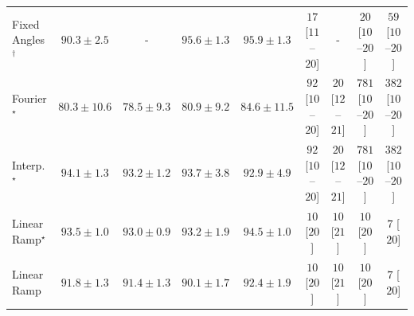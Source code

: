 \begin{tabular}{l|cccc|cccc|}
Fixed Angles$^\dagger$ & {\cellcolor[HTML]{045B8F}} \color[HTML]{F1F1F1} $90.3\pm 2.5$ & {\cellcolor[HTML]{000000}} \color[HTML]{F1F1F1} {\cellcolor{white}} \color{black} - & {\cellcolor[HTML]{023D60}} \color[HTML]{F1F1F1} $95.6\pm 1.3$ & {\cellcolor[HTML]{023B5D}} \color[HTML]{F1F1F1} $95.9\pm 1.3$ & {\cellcolor[HTML]{FFF5F1}} \color[HTML]{000000} $17$ [$11$--$20$] & {\cellcolor[HTML]{000000}} \color[HTML]{F1F1F1} {\cellcolor{white}} \color{black} - & {\cellcolor[HTML]{FFF4F0}} \color[HTML]{000000} $20$ [$10$--$20$] & {\cellcolor[HTML]{FEEBE7}} \color[HTML]{000000} $59$ [$10$--$20$] \\
Fourier$^\star$ & {\cellcolor[HTML]{2D8ABD}} \color[HTML]{F1F1F1} $80.3\pm 10.6$ & {\cellcolor[HTML]{4094C3}} \color[HTML]{F1F1F1} $78.5\pm 9.3$ & {\cellcolor[HTML]{2987BC}} \color[HTML]{F1F1F1} $80.9\pm 9.2$ & {\cellcolor[HTML]{0872B1}} \color[HTML]{F1F1F1} $84.6\pm 11.5$ & {\cellcolor[HTML]{FDE3E0}} \color[HTML]{000000} $92$ [$10$--$20$] & {\cellcolor[HTML]{FFF4F0}} \color[HTML]{000000} $20$ [$12$--$21$] & {\cellcolor[HTML]{49006A}} \color[HTML]{F1F1F1} $781$ [$10$--$20$] & {\cellcolor[HTML]{F76EA3}} \color[HTML]{F1F1F1} $382$ [$10$--$20$] \\
Interp.$^\star$ & {\cellcolor[HTML]{03466E}} \color[HTML]{F1F1F1} $94.1\pm 1.3$ & {\cellcolor[HTML]{034B76}} \color[HTML]{F1F1F1} $93.2\pm 1.2$ & {\cellcolor[HTML]{034871}} \color[HTML]{F1F1F1} $93.7\pm 3.8$ & {\cellcolor[HTML]{034D79}} \color[HTML]{F1F1F1} $92.9\pm 4.9$ & {\cellcolor[HTML]{FDE3E0}} \color[HTML]{000000} $92$ [$10$--$20$] & {\cellcolor[HTML]{FFF4F0}} \color[HTML]{000000} $20$ [$12$--$21$] & {\cellcolor[HTML]{49006A}} \color[HTML]{F1F1F1} $781$ [$10$--$20$] & {\cellcolor[HTML]{F76EA3}} \color[HTML]{F1F1F1} $382$ [$10$--$20$] \\
Linear Ramp$^\star$ & {\cellcolor[HTML]{034973}} \color[HTML]{F1F1F1} $93.5\pm 1.0$ & {\cellcolor[HTML]{034C78}} \color[HTML]{F1F1F1} $93.0\pm 0.9$ & {\cellcolor[HTML]{034B76}} \color[HTML]{F1F1F1} $93.2\pm 1.9$ & {\cellcolor[HTML]{03446A}} \color[HTML]{F1F1F1} $94.5\pm 1.0$ & {\cellcolor[HTML]{FFF7F3}} \color[HTML]{000000} $10$ [$20$] & {\cellcolor[HTML]{FFF7F3}} \color[HTML]{000000} $10$ [$21$] & {\cellcolor[HTML]{FFF7F3}} \color[HTML]{000000} $10$ [$20$] & {\cellcolor[HTML]{FFF7F3}} \color[HTML]{000000} $7$ [$20$] \\
Linear Ramp & {\cellcolor[HTML]{045483}} \color[HTML]{F1F1F1} $91.8\pm 1.3$ & {\cellcolor[HTML]{045687}} \color[HTML]{F1F1F1} $91.4\pm 1.3$ & {\cellcolor[HTML]{045C90}} \color[HTML]{F1F1F1} $90.1\pm 1.7$ & {\cellcolor[HTML]{03517E}} \color[HTML]{F1F1F1} $92.4\pm 1.9$ & {\cellcolor[HTML]{FFF7F3}} \color[HTML]{000000} $10$ [$20$] & {\cellcolor[HTML]{FFF7F3}} \color[HTML]{000000} $10$ [$21$] & {\cellcolor[HTML]{FFF7F3}} \color[HTML]{000000} $10$ [$20$] & {\cellcolor[HTML]{FFF7F3}} \color[HTML]{000000} $7$ [$20$] \\

\end{tabular}
